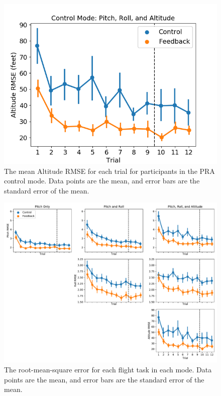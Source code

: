 \begin{figure}[b!]
    \begin{center}
        \includegraphics[width=0.8\linewidth]{figures/Aircraft/image5.png}
        \caption[The mean Altitude RMSE for each trial]{The mean Altitude RMSE for each trial for participants in the PRA control mode. Data points are the mean, and error bars are the standard error of the mean.}
        \label{figure-hfes:altitudermse}
    \end{center}
\end{figure}

\begin{figure}[b!]
    \begin{center}
        \includegraphics[width=\linewidth]{figures/Aircraft/performance_measures.pdf}
        \caption[The root-mean-square error for each flight task in each mode]{The root-mean-square error for each flight task in each mode. Data points are the mean, and error bars are the standard error of the mean.}
        \label{figure-hfes:completermse}
    \end{center}
\end{figure}

